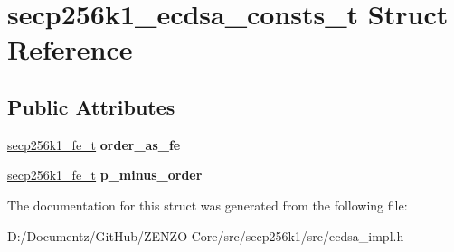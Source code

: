 \hypertarget{structsecp256k1__ecdsa__consts__t}{}\section{secp256k1\+\_\+ecdsa\+\_\+consts\+\_\+t Struct Reference}
\label{structsecp256k1__ecdsa__consts__t}
\subsection*{Public Attributes}
\begin{DoxyCompactItemize}
\item 
\mbox{\label{structsecp256k1__ecdsa__consts__t_a13ce93866b2616ef7725cccdbc2b6d40}} 
\mbox{\hyperlink{structsecp256k1__fe__t}{secp256k1\+\_\+fe\+\_\+t}} {\bfseries order\+\_\+as\+\_\+fe}
\item 
\mbox{\label{structsecp256k1__ecdsa__consts__t_a0d55a081630828f7b904a7db3c2e112a}} 
\mbox{\hyperlink{structsecp256k1__fe__t}{secp256k1\+\_\+fe\+\_\+t}} {\bfseries p\+\_\+minus\+\_\+order}
\end{DoxyCompactItemize}


The documentation for this struct was generated from the following file\+:\begin{DoxyCompactItemize}
\item 
D\+:/\+Documentz/\+Git\+Hub/\+Z\+E\+N\+Z\+O-\/\+Core/src/secp256k1/src/ecdsa\+\_\+impl.\+h\end{DoxyCompactItemize}
